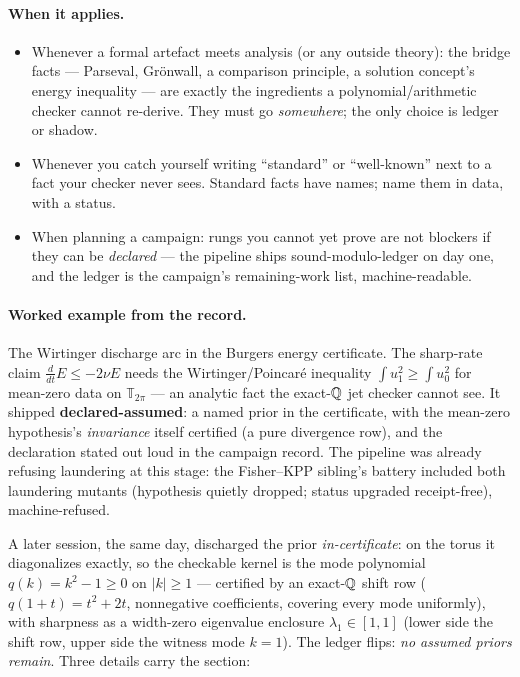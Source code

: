 \paragraph{When it applies.}
\begin{itemize}
\item Whenever a formal artefact meets analysis (or any outside
  theory): the bridge facts --- Parseval, Gr\"onwall, a comparison
  principle, a solution concept's energy inequality --- are exactly the
  ingredients a polynomial/arithmetic checker cannot re-derive. They
  must go \emph{somewhere}; the only choice is ledger or shadow.
\item Whenever you catch yourself writing ``standard'' or
  ``well-known'' next to a fact your checker never sees. Standard facts
  have names; name them in data, with a status.
\item When planning a campaign: rungs you cannot yet prove are not
  blockers if they can be \emph{declared} --- the pipeline ships
  sound-modulo-ledger on day one, and the ledger is the campaign's
  remaining-work list, machine-readable.
\end{itemize}

\paragraph{Worked example from the record.} The Wirtinger discharge arc
in the Burgers energy certificate. The sharp-rate claim
$\tfrac{d}{dt}E \le -2\nu E$ needs the Wirtinger/Poincar\'e inequality
$\int u_1^2 \ge \int u_0^2$ for mean-zero data on $\mathbb{T}_{2\pi}$
--- an analytic fact the exact-$\mathbb{Q}$ jet checker cannot see. It shipped
\textbf{declared-assumed}: a named prior in the certificate, with the
mean-zero hypothesis's \emph{invariance} itself certified (a pure
divergence row), and the declaration stated out loud in the campaign
record. The pipeline was already refusing laundering at this stage: the
Fisher--KPP sibling's battery included both laundering mutants
(hypothesis quietly dropped; status upgraded receipt-free),
machine-refused.

A later session, the same day, discharged the prior
\emph{in-certificate}: on the torus it diagonalizes exactly, so the
checkable kernel is the mode polynomial $q(k) = k^2 - 1 \ge 0$ on
$|k| \ge 1$ --- certified by an exact-$\mathbb{Q}$ shift row
($q(1+t) = t^2 + 2t$, nonnegative coefficients, covering every mode
uniformly), with sharpness as a width-zero eigenvalue enclosure
$\lambda_1 \in [1,1]$ (lower side the shift row, upper side the witness
mode $k = 1$). The ledger flips: \emph{no assumed priors remain}. Three
details carry the section:

